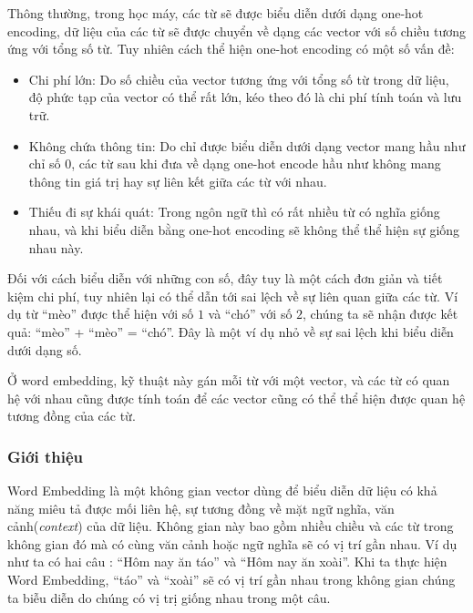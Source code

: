 Thông thường, trong học máy, các từ sẽ được biểu diễn dưới dạng one-hot encoding, dữ liệu của các từ sẽ được chuyển về dạng các vector với số chiều tương ứng với tổng số từ. Tuy nhiên cách thể hiện one-hot encoding có một số vấn đề: \cite{webpage12}
\begin{itemize}
    \item Chi phí lớn: Do số chiều của vector tương ứng với tổng số từ trong dữ liệu, độ phức tạp của vector có thể rất lớn, kéo theo đó là chi phí tính toán và lưu trữ.
    \item Không chứa thông tin: Do chỉ được biểu diễn dưới dạng vector mang hầu như chỉ số $0$, các từ sau khi đưa về dạng one-hot encode hầu như không mang thông tin giá trị hay sự liên kết giữa các từ với nhau.
    \item Thiếu đi sự khái quát: Trong ngôn ngữ thì có rất nhiều từ có nghĩa giống nhau, và khi biểu diễn bằng one-hot encoding sẽ không thể thể hiện sự giống nhau này.
\end{itemize}

Đối với cách biểu diễn với những con số, đây tuy là một cách đơn giản và tiết kiệm chi phí, tuy nhiên lại có thể dẫn tới sai lệch về sự liên quan giữa các từ. Ví dụ từ ``mèo'' được thể hiện với số $1$ và ``chó'' với số $2$, chúng ta sẽ nhận được kết quả: ``mèo'' + ``mèo'' = ``chó''. Đây là một ví dụ nhỏ về sự sai lệch khi biểu diễn dưới dạng số. \cite{webpage13}

Ở word embedding, kỹ thuật này gán mỗi từ với một vector, và các từ có quan hệ với nhau cũng được tính toán để các vector cũng có thể thể hiện được quan hệ tương đồng của các từ.

\subsubsection{Giới thiệu}
Word Embedding là một không gian vector dùng để biểu diễn dữ liệu có khả năng miêu tả được mối liên hệ, sự tương đồng về mặt ngữ nghĩa, văn cảnh(\textit{context}) của dữ liệu. Không gian này bao gồm nhiều chiều và các từ trong không gian đó mà có cùng văn cảnh hoặc ngữ nghĩa sẽ có vị trí gần nhau. Ví dụ như ta có hai câu : ``Hôm nay ăn táo'' và ``Hôm nay ăn xoài''. Khi ta thực hiện Word Embedding, ``táo'' và ``xoài'' sẽ có vị trí gần nhau trong không gian chúng ta biễu diễn do chúng có vị trị giống nhau trong một câu. \cite{webpage12}

